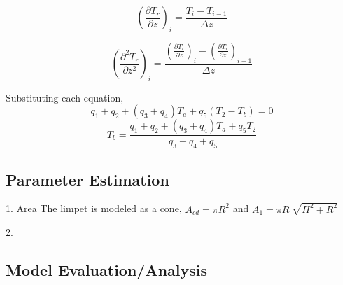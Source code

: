 \documentclass{article}
\begin{document}
$$(\frac{\partial T_r}{\partial z})_i=\frac{T_i - T_{i-1}}{\Delta z}$$

$$(\frac{\partial^2 T_r}{\partial z^2})_i=\frac{(\frac{\partial T_r}{\partial z})_i-(\frac{\partial T_r}{\partial z})_{i-1}}{\Delta z}$$

Substituting each equation, 
$$q_1 + q_2 + (q_3+q_4)T_a + q_5(T_2 - T_b) = 0$$
$$T_b = \frac{q_1 + q_2 + (q_3+q_4)T_a + q_5 T_2}{q_3 + q_4 + q_5}$$

\subsection{Parameter Estimation}
1. Area
The limpet is modeled as a cone, $A_{cd}=\pi R^2$ and $A_1 = \pi R \sqrt[]{H^2 + R^2}$

2.

\subsection{Model Evaluation/Analysis}
\end{document}
